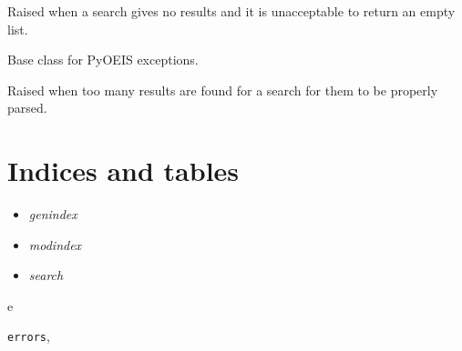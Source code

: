 \documentclass[letterpaper,10pt,english]{sphinxmanual}
\begin{document}
\begin{fulllineitems}
\label{api:errors.NoResultsError}
Raised when a search gives no results and it is unacceptable to return
an empty list.

\end{fulllineitems}


\begin{fulllineitems}
\label{api:errors.OEISException}
Base class for PyOEIS exceptions.

\end{fulllineitems}


\begin{fulllineitems}
\label{api:errors.TooManyResultsError}
Raised when too many results are found for a search for them to be
properly parsed.

\end{fulllineitems}



\chapter{Indices and tables}
\label{index:indices-and-tables}\begin{itemize}
\item {} 
\emph{genindex}

\item {} 
\emph{modindex}

\item {} 
\emph{search}

\end{itemize}


\renewcommand{\indexname}{Python Module Index}
\begin{theindex}
\def\bigletter#1{{\Large\sffamily#1}\nopagebreak\vspace{1mm}}
\bigletter{e}
\item {\texttt{errors}}, \pageref{api:module-errors}
\end{theindex}

\renewcommand{\indexname}{Index}
\printindex
\end{document}
